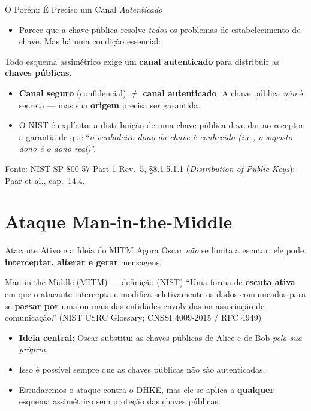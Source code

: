 \documentclass{beamer}
\begin{document}
\begin{frame}{O Porém: É Preciso um Canal \emph{Autenticado}}
    \begin{itemize}
        \item Parece que a chave pública resolve \emph{todos} os problemas de estabelecimento de chave. Mas há uma condição essencial:
    \end{itemize}
    \medskip
    \begin{tcolorbox}[colback=red!5,colframe=red!60!black,boxrule=0.5pt]
        \centering\footnotesize
        Todo esquema assimétrico exige um \textbf{canal autenticado} para distribuir as \textbf{chaves públicas}.
    \end{tcolorbox}
    \medskip
    \begin{itemize}
        \footnotesize
        \item \textbf{Canal seguro} (confidencial) $\neq$ \textbf{canal autenticado}. A chave pública \emph{não} é secreta --- mas sua \textbf{origem} precisa ser garantida.
        \item O NIST é explícito: a distribuição de uma chave pública deve dar ao receptor a garantia de que ``\emph{o verdadeiro dono da chave é conhecido (i.e., o suposto dono é o dono real)}''.
    \end{itemize}
    \smallskip
    {\tiny Fonte: NIST SP 800-57 Part 1 Rev.\ 5, §8.1.5.1.1 (\textit{Distribution of Public Keys}); Paar et al., cap.\ 14.4.}
\end{frame}

\section{Ataque Man-in-the-Middle}

\begin{frame}{Atacante Ativo e a Ideia do MITM}
    Agora Oscar \emph{não} se limita a escutar: ele pode \textbf{interceptar, alterar e gerar} mensagens.
    \medskip
    \begin{block}{Man-in-the-Middle (MITM) --- definição (NIST)}
        \footnotesize
        ``Uma forma de \textbf{escuta ativa} em que o atacante intercepta e modifica seletivamente os dados comunicados para se \textbf{passar por} uma ou mais das entidades envolvidas na associação de comunicação.''
        \hfill {\tiny (NIST CSRC Glossary; CNSSI 4009-2015 / RFC 4949)}
    \end{block}
    \medskip
    \begin{itemize}
        \footnotesize
        \item \textbf{Ideia central:} Oscar substitui as chaves públicas de Alice e de Bob \emph{pela sua própria}.
        \item Isso é possível \alert{sempre que as chaves públicas não são autenticadas}.
        \item Estudaremos o ataque contra o DHKE, mas ele se aplica a \textbf{qualquer} esquema assimétrico sem proteção das chaves públicas.
    \end{itemize}
\end{frame}
\end{document}
